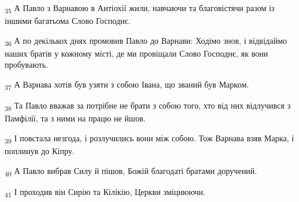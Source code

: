 \begin{tcolorbox}
\textsubscript{35} А Павло з Варнавою в Антіохії жили, навчаючи та благовістячи разом із іншими багатьома Слово Господнє.
\end{tcolorbox}
\begin{tcolorbox}
\textsubscript{36} А по декількох днях промовив Павло до Варнави: Ходімо знов, і відвідаймо наших братів у кожному місті, де ми провіщали Слово Господнє, як вони пробувають.
\end{tcolorbox}
\begin{tcolorbox}
\textsubscript{37} А Варнава хотів був узяти з собою Івана, що званий був Марком.
\end{tcolorbox}
\begin{tcolorbox}
\textsubscript{38} Та Павло вважав за потрібне не брати з собою того, хто від них відлучився з Памфілії, та з ними на працю не йшов.
\end{tcolorbox}
\begin{tcolorbox}
\textsubscript{39} І повстала незгода, і розлучились вони між собою. Тож Варнава взяв Марка, і поплинув до Кіпру.
\end{tcolorbox}
\begin{tcolorbox}
\textsubscript{40} А Павло вибрав Силу й пішов, Божій благодаті братами доручений.
\end{tcolorbox}
\begin{tcolorbox}
\textsubscript{41} І проходив він Сирію та Кілікію, Церкви зміцнюючи.
\end{tcolorbox}
